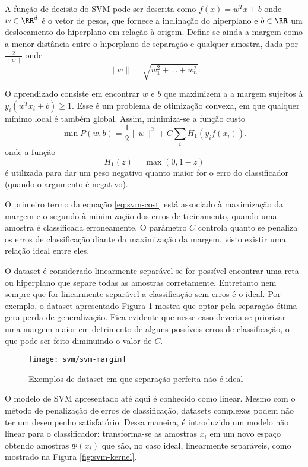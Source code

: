 A função de decisão do SVM pode ser descrita como $f(x)=w^T x+ b$ onde $w \in \RR^d$ é o vetor de pesos, que fornece a inclinação do hiperplano e $b \in \RR$ um deslocamento do hiperplano em relação à origem. Define-se ainda a margem como a menor distância entre o hiperplano de separação e qualquer amostra, dada por $\frac{2}{\|w\|}$ onde
\begin{equation}
\|w\| = \sqrt{w_1^2 + \dots + w_n^2}.
\end{equation}

O aprendizado consiste em encontrar $w$ e $b$ que maximizem a a margem sujeitos à $y_i(w^T x_i+b) \geq 1$. Esse é um problema de otimização convexa, em que qualquer mínimo local é também global. Assim, minimiza-se a função custo \cite{bishop2007}
\begin{equation}
	\label{eq:svm-cost}
	\min P(w,b) = \frac{1}{2}\|w\|^2 + C\sum_i H_1(y_i f(x_i)).
\end{equation}
onde a função
\begin{equation*}
H_1(z)=\max(0,1-z)
\end{equation*}
é utilizada para dar um peso negativo quanto maior for o erro do classificador (quando o argumento é negativo).

O primeiro termo da equação \eqref{eq:svm-cost} está associado à maximização da margem e o segundo à minimização dos erros de treinamento, quando uma amostra é classificada erroneamente. O parâmetro $C$ controla quanto se penaliza os erros de classificação diante da maximização da margem, visto existir uma relação ideal entre eles.

O dataset é considerado linearmente separável se for possível encontrar uma reta ou hiperplano que separe todas as amostras corretamente. Entretanto nem sempre que for linearmente separável a classificação sem erros é o ideal. Por exemplo, o dataset apresentado Figura \ref{fig:svm-margin} mostra que optar pela separação ótima gera perda de generalização. Fica evidente que nesse caso deveria-se priorizar uma margem maior em detrimento de alguns possíveis erros de classificação, o que pode ser feito diminuindo o valor de $C$.

\begin{figure}
\centering
\texttt{[image: svm/svm-margin]}
\caption{Exemplos de dataset em que separação perfeita não é ideal}
\label{fig:svm-margin}
\end{figure}

O modelo de SVM apresentado até aqui é conhecido como linear. Mesmo com o método de penalização de erros de classificação, datasets complexos podem não ter um desempenho satisfatório. Dessa maneira, é introduzido um modelo não linear para o classificador: transforma-se as amostras $x_i$ em um novo espaço obtendo amostras $\Phi(x_i)$ que são, no caso ideal, linearmente separáveis, como mostrado na Figura \ref{fig:svm-kernel}.

